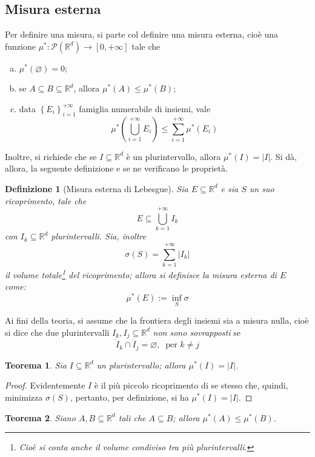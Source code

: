 \documentclass[11pt]{article}
\theoremstyle{style}
\newtheorem{definizione}{Definizione}[section]
\newtheorem{teorema}{Teorema}[section]
\numberwithin{equation}{subsection}
\begin{document}
	\subsection{Misura esterna}
	Per definire una misura, si parte col definire una misura esterna, cio\`e una funzione $\mu^*  : \mathcal{P} (\mathbb{R}^d) \to [0,+\infty]$ tale che
	\begin{enumerate}[(a).]
		\item $\mu^* (\varnothing)=0$;
		\item se $A \subseteq B \subseteq \mathbb{R}^d$, allora $\mu^* (A) \le \mu^* (B)$;
		\item data $\left\{ E_i \right\} _{i=1} ^{+\infty} $ famiglia numerabile di insiemi, vale
			\[
			\mu^* \left(\bigcup_{i=1} ^{+\infty} E_i\right) \le \sum_{i=1}^{+\infty} \mu^* (E_i)
			\] 
	\end{enumerate}
	Inoltre, si richiede che se $I \subseteq \mathbb{R}^d$ \`e un plurintervallo, allora $\mu^* (I) = \lvert I \rvert $.
	Si d\`a, allora, la seguente definizione e se ne verificano le propriet\`a.
	\begin{definizione}
		[Misura esterna di Lebesgue]
	Sia $E \subseteq \mathbb{R}^d$ e sia $S$ un suo ricoprimento, tale che
	\[
	E \subseteq \bigcup_{k=1} ^{+\infty} I_k
	\] 
	con $I_k \subseteq \mathbb{R}^d$ plurintervalli. Sia, inoltre
	\[
	\sigma (S) = \sum_{k=1}^{+\infty} \lvert I_k \rvert 
	\] 
	il volume totale\footnote{Cio\`e si conta anche il volume condiviso tra pi\`u plurintervalli.} del ricoprimento; allora si definisce la \textit{misura esterna} di $E$ come:
	\[
	\mu^* (E) := \inf_S \sigma 
	\] 
	\end{definizione}
Ai fini della teoria, si assume che la frontiera degli insiemi sia a misura nulla, cio\`e si dice che due plurintervalli $I_k, I_j \subseteq \mathbb{R}^d$ \textit{non sono sovrapposti} se
\[
	\mathring{I}_k \cap \mathring{I}_j = \varnothing, \ \text{ per } k \neq j
\] 
\begin{teorema}
	Sia $I \subseteq \mathbb{R}^d$ un plurintervallo; allora $\mu^* (I) = \lvert I \rvert $.
\end{teorema}
	\begin{proof}
		Evidentemente $I$ \`e il pi\`u piccolo ricoprimento di se stesso che, quindi, minimizza $\sigma (S)$, pertanto, per definizione, si ha $\mu^* (I) = \lvert I \rvert $.
	\end{proof}
\begin{teorema}
	Siano $A,B \subseteq \mathbb{R}^d$ tali che $A \subseteq B$; allora $\mu^* (A) \le \mu^* (B)$.
\end{teorema}
\end{document}
